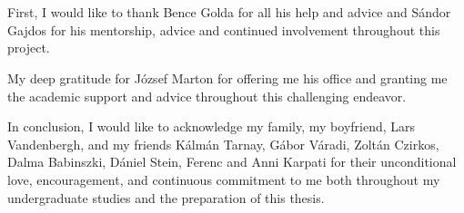 \chapter*{\koszonetnyilvanitas}


First, I would like to thank  Bence Golda for all his help and advice and Sándor Gajdos for his mentorship, advice and continued involvement throughout this project. 

My deep  gratitude  for József Marton for offering me his office and granting me the academic support and advice throughout this challenging endeavor.  

In conclusion, I would like to acknowledge my family, my boyfriend, Lars Vandenbergh, and my friends Kálmán Tarnay, Gábor Váradi, Zoltán Czirkos, Dalma Babinszki, Dániel Stein, Ferenc and Anni  Karpati for their unconditional love, encouragement, and continuous  commitment to me both throughout my undergraduate studies  and the preparation of this thesis.